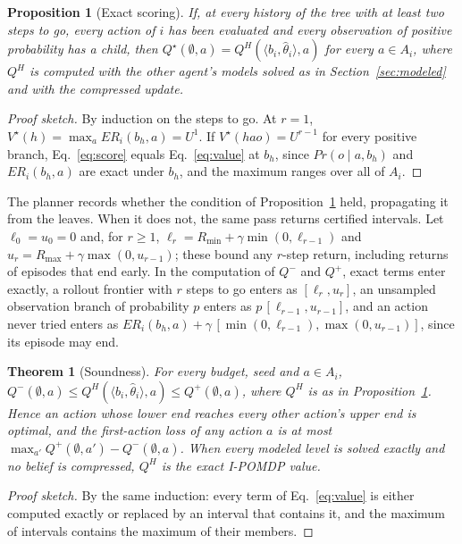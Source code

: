 \documentclass{article}
\newtheorem{proposition}{Proposition}
\newtheorem{theorem}{Theorem}
\newcommand{\ER}{\mathit{ER}}
\newcommand{\hth}{\hat{\theta}}
\renewcommand{\Pr}{\mathit{Pr}}
\begin{document}
\begin{proposition}[Exact scoring]
\label{prop:exact}
If, at every history of the tree with at least two steps to go, every action of $i$ has been evaluated and every observation of positive probability has a child, then $Q^\star(\emptyset, a) = Q^H(\langle b_i, \hth_i \rangle, a)$ for every $a \in A_i$, where $Q^H$ is computed with the other agent's models solved as in Section~\ref{sec:modeled} and with the compressed update.
\end{proposition}
\begin{proof}[Proof sketch]
By induction on the steps to go. At $r = 1$, $V^\star(h) = \max_a \ER_i(b_h, a) = U^1$. If $V^\star(h a o) = U^{r-1}$ for every positive branch, Eq.~\ref{eq:score} equals Eq.~\ref{eq:value} at $b_h$, since $\Pr(o \mid a, b_h)$ and $\ER_i(b_h, a)$ are exact under $b_h$, and the maximum ranges over all of $A_i$.
\end{proof}

The planner records whether the condition of Proposition~\ref{prop:exact} held, propagating it from the leaves. When it does not, the same pass returns certified intervals. Let $\ell_0 = u_0 = 0$ and, for $r \geq 1$, $\ell_r = R_{\min} + \gamma \min(0, \ell_{r-1})$ and $u_r = R_{\max} + \gamma \max(0, u_{r-1})$; these bound any $r$-step return, including returns of episodes that end early. In the computation of $Q^-$ and $Q^+$, exact terms enter exactly, a rollout frontier with $r$ steps to go enters as $[\ell_r, u_r]$, an unsampled observation branch of probability $p$ enters as $p\,[\ell_{r-1}, u_{r-1}]$, and an action never tried enters as $\ER_i(b_h, a) + \gamma\,[\min(0, \ell_{r-1}), \max(0, u_{r-1})]$, since its episode may end.

\begin{theorem}[Soundness]
\label{prop:bounds}
For every budget, seed and $a \in A_i$, $Q^-(\emptyset, a) \leq Q^H(\langle b_i, \hth_i \rangle, a) \leq Q^+(\emptyset, a)$, where $Q^H$ is as in Proposition~\ref{prop:exact}. Hence an action whose lower end reaches every other action's upper end is optimal, and the first-action loss of any action $a$ is at most $\max_{a'} Q^+(\emptyset, a') - Q^-(\emptyset, a)$. When every modeled level is solved exactly and no belief is compressed, $Q^H$ is the exact I-POMDP value.
\end{theorem}
\begin{proof}[Proof sketch]
By the same induction: every term of Eq.~\ref{eq:value} is either computed exactly or replaced by an interval that contains it, and the maximum of intervals contains the maximum of their members.
\end{proof}
\end{document}
